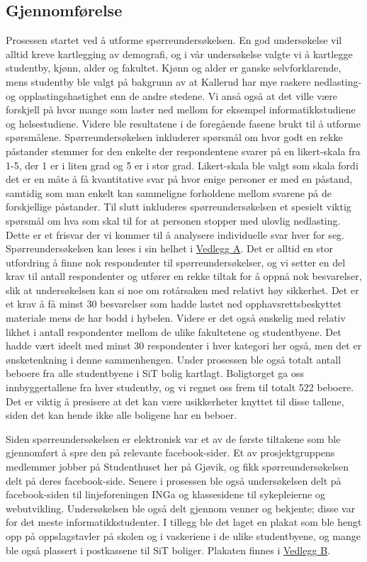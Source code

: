 \subsection{Gjennomførelse}
Prosessen startet ved å utforme spørreundersøkelsen. En god undersøkelse vil alltid kreve kartlegging av demografi, og i vår undersøkelse valgte vi å kartlegge studentby, kjønn, alder og fakultet. Kjønn og alder er ganske selvforklarende, mens studentby ble valgt på bakgrunn av at Kallerud har mye raskere nedlasting- og opplastingshastighet enn de andre stedene. Vi anså også at det ville være forskjell på hvor mange som laster ned mellom for eksempel informatikkstudiene og helsestudiene. Videre ble resultatene i de foregående fasene brukt til å utforme spørsmålene. Spørreundersøkelsen inkluderer spørsmål om hvor godt en rekke påstander stemmer for den enkelte der respondentene svarer på en likert-skala fra 1-5, der 1 er i liten grad og 5 er i stor grad. Likert-skala ble valgt som skala fordi det er en måte å få kvantitative svar på hvor enige personer er med en påstand, samtidig som man enkelt kan sammeligne forholdene mellom svarene på de forskjellige påstander. Til slutt inkluderes spørreundersøkelsen et spesielt viktig spørsmål om hva som skal til for at personen stopper med ulovlig nedlasting. Dette er et frisvar der vi kommer til å analysere individuelle svar hver for seg. Spørreundersøkelsen kan leses i sin helhet i \hyperref[undersokelse]{Vedlegg A}.
\newline
Det er alltid en stor utfordring å finne nok respondenter til spørreundersøkelser, og vi setter en del krav til antall respondenter og utfører en rekke tiltak for å oppnå nok besvarelser, slik at undersøkelsen kan si noe om rotårsaken med relativt høy sikkerhet. Det er et krav å få minst 30 besvarelser som hadde lastet ned opphavsrettsbeskyttet materiale mens de har bodd i hybelen. Videre er det også ønskelig med relativ likhet i antall respondenter mellom de ulike fakultetene og studentbyene. Det hadde vært ideelt med minst 30 respondenter i hver kategori her også, men det er ønsketenkning i denne sammenhengen. Under prosessen ble også totalt antall beboere fra alle studentbyene i SiT bolig kartlagt. Boligtorget ga oss innbyggertallene fra hver studentby, og vi regnet oss frem til totalt 522 beboere. Det er viktig å presisere at det kan være usikkerheter knyttet til disse tallene, siden det kan hende ikke alle boligene har en beboer.

Siden spørreundersøkelsen er elektronisk var et av de første tiltakene som ble gjennomført å spre den på relevante facebook-sider. Et av prosjektgruppens medlemmer jobber på Studenthuset her på Gjøvik, og fikk spørreundersøkelsen delt på deres facebook-side. Senere i prosessen ble også undersøkelsen delt på facebook-siden til linjeforeningen INGa og klassesidene til sykepleierne og webutvikling. Undersøkelsen ble også delt gjennom venner og bekjente; disse var for det meste informatikkstudenter. I tillegg ble det laget en plakat som ble hengt opp på oppslagstavler på skolen og i vaskeriene i de ulike studentbyene, og mange ble også plassert i postkassene til SiT boliger. Plakaten finnes i \hyperref[plakat]{Vedlegg B}. 


